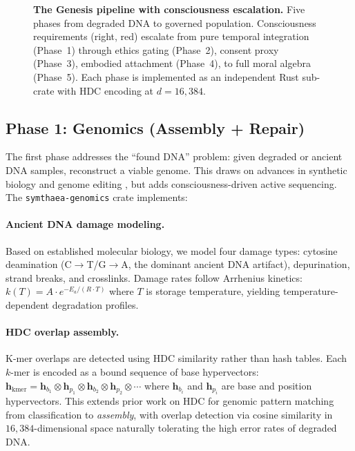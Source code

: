 \documentclass[11pt,letterpaper]{article}
\newcommand{\hv}{\mathbf{h}}
\newcommand{\bind}{\otimes}
\newcommand{\dimHDC}{16{,}384}
\begin{document}
\begin{figure}[htbp]
\caption{\textbf{The Genesis pipeline with consciousness escalation.}
Five phases from degraded DNA to governed population. Consciousness requirements
(right, red) escalate from pure temporal integration (Phase~1) through ethics
gating (Phase~2), consent proxy (Phase~3), embodied attachment (Phase~4), to
full moral algebra (Phase~5). Each phase is implemented as an independent Rust
sub-crate with HDC encoding at $d = \dimHDC$.}
\label{fig:pipeline}
\end{figure}

\subsection{Phase 1: Genomics (Assembly + Repair)}

The first phase addresses the ``found DNA'' problem: given degraded or ancient
DNA samples, reconstruct a viable genome. This draws on advances in synthetic
biology \cite{church2012regenesis} and genome editing \cite{doudna2014new},
but adds consciousness-driven active sequencing. The \texttt{symthaea-genomics}
crate implements:

\paragraph{Ancient DNA damage modeling.} Based on established molecular biology,
we model four damage types: cytosine deamination (C$\rightarrow$T/G$\rightarrow$A,
the dominant ancient DNA artifact), depurination, strand breaks, and crosslinks.
Damage rates follow Arrhenius kinetics: $k(T) = A \cdot e^{-E_a / (R \cdot T)}$
where $T$ is storage temperature, yielding temperature-dependent degradation
profiles.

\paragraph{HDC overlap assembly.} K-mer overlaps are detected using HDC
similarity rather than hash tables. Each $k$-mer is encoded as a bound sequence
of base hypervectors: $\hv_\text{kmer} = \hv_{b_1} \bind \hv_{p_1} \bind
\hv_{b_2} \bind \hv_{p_2} \bind \cdots$ where $\hv_{b_i}$ and $\hv_{p_i}$ are
base and position hypervectors. This extends prior work on HDC for genomic
pattern matching \cite{kim2020geniehd} from classification to \emph{assembly},
with overlap detection via cosine similarity in $\dimHDC$-dimensional space
naturally tolerating the high error rates of degraded DNA.
\end{document}
